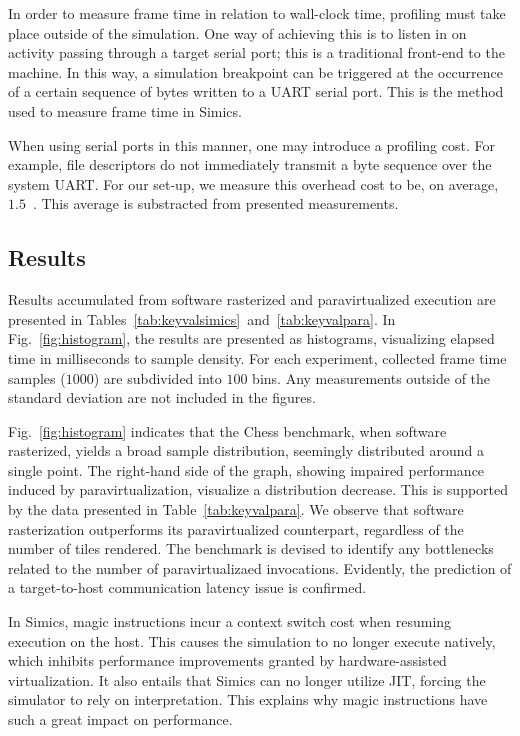 In order to measure frame time in relation to wall-clock time, profiling must take place outside of the simulation.
One way of achieving this is to listen in on activity passing through a target serial port; this is a traditional front-end to the machine.
In this way, a simulation breakpoint can be triggered at the occurrence of a certain sequence of bytes written to a UART serial port.
This is the method used to measure frame time in Simics.

When using serial ports in this manner, one may introduce a profiling cost.
For example, file descriptors do not immediately transmit a byte sequence over the system UART.
For our set-up, we measure this overhead cost to be, on average, $1.5$~\milli\second .
This average is substracted from presented measurements.

\subsection{Results}
\label{sec:results}
Results accumulated from software rasterized and paravirtualized execution are presented in Tables~\ref{tab:keyvalsimics}~and~\ref{tab:keyvalpara}.
In Fig.~\ref{fig:histogram}, the results are presented as histograms, visualizing elapsed time in milliseconds to sample density.
For each experiment, collected frame time samples ($1000$) are subdivided into $100$ bins.
Any measurements outside of the standard deviation are not included in the figures.

Fig.~\ref{fig:histogram} indicates that the Chess benchmark, when software rasterized, yields a broad sample distribution, seemingly distributed around a single point.
The right-hand side of the graph, showing impaired performance induced by paravirtualization, visualize a distribution decrease.
This is supported by the data presented in Table~\ref{tab:keyvalpara}.
We observe that software rasterization outperforms its paravirtualized counterpart, regardless of the number of tiles rendered.
The benchmark is devised to identify any bottlenecks related to the number of paravirtualizaed invocations.
Evidently, the prediction of a target-to-host communication latency issue is confirmed.

In Simics, magic instructions incur a context switch cost when resuming execution on the host.
This causes the simulation to no longer execute natively, which inhibits performance improvements granted by hardware-assisted virtualization.
It also entails that Simics can no longer utilize JIT, forcing the simulator to rely on interpretation.
This explains why magic instructions have such a great impact on performance.

